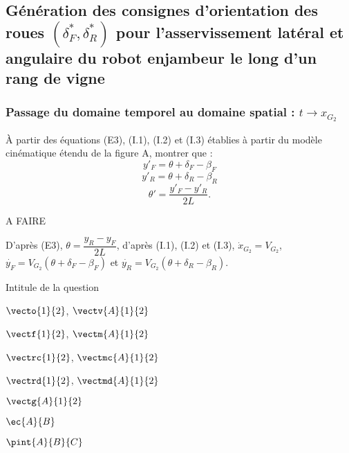 \documentclass[11pt]{article}
\begin{document}
\subsection{Génération des consignes d'orientation des roues $\left(\delta^*_F,\delta^*_R\right)$ pour l'asservissement latéral et angulaire du robot enjambeur le long d'un rang de vigne}

\subsubsection{Passage du domaine temporel au domaine spatial : $t\to x_{G_2}$}

\UPSTIquestion À partir des équations (E3), (I.1), (I.2) et (I.3) établies à partir du modèle cinématique étendu de la
figure A, montrer que : 
$$ y'_F = \theta + \delta_F-\beta_F $$
$$ y'_R = \theta + \delta_R-\beta_R $$
$$ \theta'=\dfrac{y'_F-y'_R}{2L}.$$

\begin{UPSTIcorrige}

A FAIRE


D'après (E3), $  \theta = \dfrac{ y_{R} - y_F}{2L } $, d'après  (I.1), (I.2) et (I.3), $\dot{x}_{G_2}=V_{G_2}$, $\dot{y_F}=V_{G_2}\left(\theta + \delta_F - \beta_F\right)$ et  $\dot{y_R}=V_{G_2}\left(\theta + \delta_R - \beta_R\right)$. 

\end{UPSTIcorrige}


\UPSTIquestion Intitule de la question

$\vecto{1}{2}$, $\vectv{A}{1}{2}$

$\vectf{1}{2}$, $\vectm{A}{1}{2}$

$\vectrc{1}{2}$, $\vectmc{A}{1}{2}$

$\vectrd{1}{2}$, $\vectmd{A}{1}{2}$

$\vectg{A}{1}{2}$

$\ec{A}{B}$

$\pint{A}{B}{C}$
\end{document}
